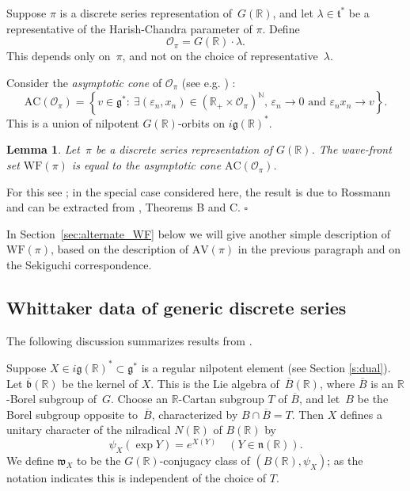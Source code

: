 \documentclass[10pt,leqno]{article}
\newtheorem{lemma}[equation]{Lemma}
\numberwithin{equation}{section}
\newcommand{\qed}{\hfill $\square$ \medskip}
\newcommand{\R}{\mathbb R}
\newcommand{\n}{\mathfrak n}
\renewcommand{\t}{\mathfrak t}
\newcommand{\g}{\mathfrak g}
\newcommand{\w}{\mathfrak w}
\newcommand{\AV}{\mathrm{AV}}
\newcommand{\WF}{\mathrm{WF}}
\newcommand{\AC}{\mathrm{AC}}
\begin{document}
Suppose $\pi$ is a discrete series representation of~$G(\R)$, and let $\lambda\in\t^*$ be a representative of the Harish-Chandra parameter of $\pi$.
Define
\begin{equation} \label{semisimple_orbit_HC} \mathcal{O}_{\pi}=G(\R)\cdot\lambda.\end{equation}
This depends only on~$\pi$, and not on the choice of representative~$\lambda$. 

Consider the \emph{asymptotic cone} of $\mathcal{O}_\pi$ (see e.g. \cite[Section 3]{AVAV}) :
\[ \AC(\mathcal{O}_\pi) = \left\{ v \in \g^*  :\ \text{$\exists (\varepsilon_n, x_n)\in (\R_+ \times \mathcal{O}_\pi)^\mathbb{N}$, $\varepsilon_n \to 0$ and $\varepsilon_n x_n \to v$}  \right\}. \]
This is a union of nilpotent $G(\R)$-orbits on $i\g(\R)^*$.

\begin{lemma} \label{lem:WF_and_AC}
Let~$\pi$ be a discrete series representation of $G(\R)$. The wave-front set $\WF(\pi)$ is equal to the asymptotic cone $\AC(\mathcal{O}_\pi)$.
\end{lemma}

For this see \cite{HarrisHeOlafsson}; in the special case considered here, the result is due to Rossmann and can be extracted from \cite{RossmannPicard}, Theorems B and C. \qed

In Section~\ref{sec:alternate_WF} below we will give another simple
description of~$\WF(\pi)$, based on the description of $\AV(\pi)$ in
the previous paragraph and on the Sekiguchi correspondence.

\subsection{Whittaker data of generic discrete series}
\label{s:gds}

The following discussion summarizes results from \cite[Section~3]{adams_kaletha}.


Suppose $X\in i\g(\R)^*\subset \g^*$ is a regular nilpotent element (see Section \ref{s:dual}).
Let $\overline{\mathfrak b}(\R)$ be the kernel of $X$. This is the Lie algebra of~$\overline{B}(\R)$, where
$\overline{B}$ is an $\R$-Borel subgroup of~$G$.
Choose an $\R$-Cartan subgroup $T$ of
$\overline B$, and let~$B$ be the  Borel
subgroup opposite to~$\overline{B}$, characterized by $B\cap \overline B=T$.
Then $X$ defines a unitary
character of the nilradical  $N(\R)$  of $B(\R)$ by
\[ 
\psi_X(\exp Y)=e^{X(Y)}\quad (Y\in\n(\R)).
\] 
We define $\w_X$ to be the $G(\R)$-conjugacy class of $(B(\R),\psi_X)$; as the notation indicates this is independent 
of the choice of $T$.
\end{document}

